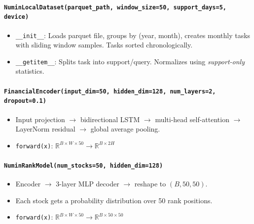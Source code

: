 \documentclass[11pt,a4paper]{article}
\begin{document}
\paragraph{\texttt{NuminLocalDataset(parquet\_path, window\_size=50, support\_days=5, device)}}
\begin{itemize}[nosep]
  \item \texttt{\_\_init\_\_}: Loads parquet file, groups by (year, month), creates monthly tasks with sliding window samples. Tasks sorted chronologically.
  \item \texttt{\_\_getitem\_\_}: Splits task into support/query. Normalizes using \emph{support-only} statistics.
\end{itemize}

\paragraph{\texttt{FinancialEncoder(input\_dim=50, hidden\_dim=128, num\_layers=2, dropout=0.1)}}
\begin{itemize}[nosep]
  \item Input projection $\to$ bidirectional LSTM $\to$ multi-head self-attention $\to$ LayerNorm residual $\to$ global average pooling.
  \item \texttt{forward(x)}: $\mathbb{R}^{B \times W \times 50} \to \mathbb{R}^{B \times 2H}$
\end{itemize}

\paragraph{\texttt{NuminRankModel(num\_stocks=50, hidden\_dim=128)}}
\begin{itemize}[nosep]
  \item Encoder $\to$ 3-layer MLP decoder $\to$ reshape to $(B, 50, 50)$.
  \item Each stock gets a probability distribution over 50 rank positions.
  \item \texttt{forward(x)}: $\mathbb{R}^{B \times W \times 50} \to \mathbb{R}^{B \times 50 \times 50}$
\end{itemize}
\end{document}
